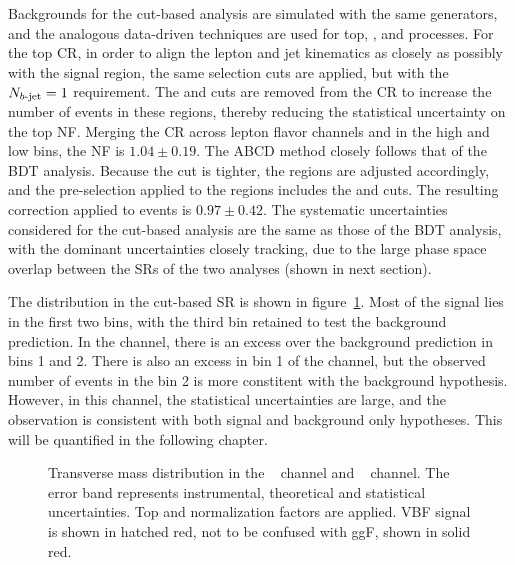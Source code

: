Backgrounds for the cut-based analysis are simulated with the same
generators, and the analogous data-driven techniques are used for top,
\ZDY, and \wjets processes. For the top CR, in order to align the
lepton and jet kinematics as closely as possibly with the signal
region, the same selection cuts are applied, but with the $N_{b\textrm{-jet}} = 1$
requirement. The \dphill and \mjj cuts are removed from the CR to
increase the number of events in these regions, thereby reducing the
statistical uncertainty on the top NF. Merging the CR across lepton
flavor channels and in the high and low \mjj bins, the NF is $1.04 \pm
0.19$. The ABCD method closely follows that of the BDT
analysis. Because the \calomet cut is tighter, the regions are
adjusted accordingly, and the pre-selection applied to the regions
includes the \pTtot and \mjj cuts. The resulting correction applied to
\ZDYll events is $0.97 \pm 0.42$. The systematic uncertainties
considered for the cut-based analysis are the same as those of the BDT
analysis, with the dominant uncertainties closely tracking, due to
the large phase space overlap between the SRs of the two analyses
(shown in next section).

The \mT distribution in the cut-based SR is shown in
figure~\ref{chap:analysis:fig:cutbased_mt}. Most of the signal lies in
the first two \mT bins, with the third bin retained to test the
background prediction. In the \emme channel,
there is an excess over the background prediction in bins 1 and
2. There is also an excess in bin 1 of the \eemm channel, but the
observed number of events in the bin 2 is more constitent with the
background hypothesis. However, in this channel, the statistical
uncertainties are large, and the observation is consistent with both
signal and background only hypotheses. This will be quantified in the
following chapter. 

\begin{figure}[h]
\centering
{}
\caption{Transverse mass distribution in the
    ~ \emme channel and
    ~ \eemm channel. The
    error band represents instrumental, theoretical and statistical
    uncertainties. Top and \ZDY normalization factors are applied. VBF
    signal is shown in hatched red, not to be confused with ggF, shown
    in solid red.}
\label{chap:analysis:fig:cutbased_mt}
\end{figure}

